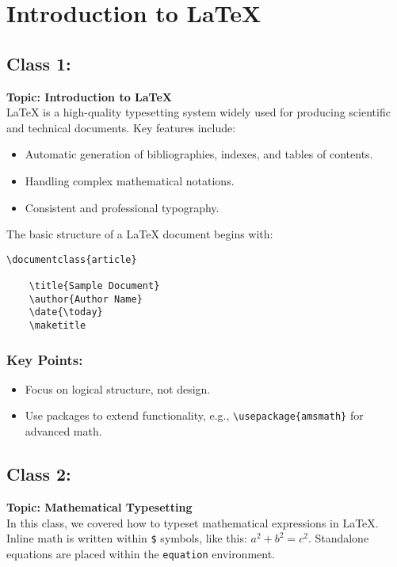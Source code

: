 \section{Introduction to \LaTeX}
\subsection{Class 1:}
\textbf{Topic: Introduction to \LaTeX} \\

\LaTeX{} is a high-quality typesetting system widely used for producing scientific and technical documents. Key features include:
\begin{itemize}
    \item Automatic generation of bibliographies, indexes, and tables of contents.
    \item Handling complex mathematical notations.
    \item Consistent and professional typography.
\end{itemize}

The basic structure of a \LaTeX{} document begins with:
\begin{verbatim}
\documentclass{article}

    \title{Sample Document}
    \author{Author Name}
    \date{\today}
    \maketitle

\end{verbatim}

\subsubsection{Key Points:}
\begin{itemize}
    \item Focus on logical structure, not design.
    \item Use packages to extend functionality, e.g., \verb|\usepackage{amsmath}| for advanced math.
\end{itemize}

\subsection{Class 2:}
\textbf{Topic: Mathematical Typesetting} \\

In this class, we covered how to typeset mathematical expressions in \LaTeX{}. Inline math is written within \verb|$| symbols, like this: $a^2 + b^2 = c^2$. Standalone equations are placed within the \verb|equation| environment.


